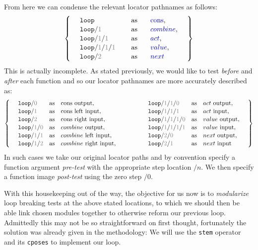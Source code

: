 \documentclass[twoside]{article}
\newcommand{\as}{\mbox{as}}
\newcommand{\vi}[1][\_]{\mbox{$value$#1input}}
\newcommand{\vo}[1][\_]{\mbox{$value$#1output}}
\newcommand{\ai}[1][\_]{\mbox{$act$#1input}}
\newcommand{\ao}[1][\_]{\mbox{$act$#1output}}
\newcommand{\cli}[1][\_]{\mbox{$combine$#1left#1input}}
\newcommand{\cri}[1][\_]{\mbox{$combine$#1right#1input}}
\newcommand{\co}[1][\_]{\mbox{$combine$#1output}}
\newcommand{\nei}[1][\_]{\mbox{$next$#1input}}
\newcommand{\no}[1][\_]{\mbox{$next$#1output}}
\newcommand{\coli}[1][\_]{\mbox{cons#1left#1input}}
\newcommand{\cori}[1][\_]{\mbox{cons#1right#1input}}
\newcommand{\coo}[1][\_]{\mbox{cons#1output}}
\newcommand{\tab}[1][1.125cm]{\hspace{#1}}
\newcommand{\col}[1][0ex]{& \hspace{#1}}
\newcommand{\tcb}[1]{\textcolor{blue}{#1}}
\newcommand{\tcg}[1]{\textcolor{gray}{#1}}
\newcommand{\tlp}{\texttt{\mbox{loop}}}
\newcommand{\cons}{\mbox{cons}}
\begin{document}
From here we can condense the relevant locator pathnames as follows:
$$ \left\{\tab[2ex]\begin{array}{lcl}
\tlp					\col[3ex] \mbox{as} \col[2ex] \tcb{\cons},		\\
\tlp/\tcg{1}				\col[3ex] \mbox{as} \col[2ex] \tcb{combine},		\\
\tlp/\tcg{1}/\tcg{1}			\col[3ex] \mbox{as} \col[2ex] \tcb{act},		\\
\tlp/\tcg{1}/\tcg{1}/\tcg{1}		\col[3ex] \mbox{as} \col[2ex] \tcb{value},		\\
\tlp/\tcg{2}				\col[3ex] \mbox{as} \col[2ex] \tcb{next}
\end{array}\tab[2ex]\right\} $$
This is actually incomplete. As stated previously, we would like to test \emph{before} and \emph{after} each function
and so our locator pathnames are more accurately described as:
$$ \def\arraystretch{1.1}\left\{\tab[2ex]\begin{array}{lcllcl}
\tlp/\tcg{0}		& \as & \coo[ ],	\col[10ex] \tlp/\tcg{1}/\tcg{1}/\tcg{0}			& \as & \ao[ ],		\\
\tlp/\tcg{1}		& \as & \coli[ ],	\col[10ex] \tlp/\tcg{1}/\tcg{1}/\tcg{1}			& \as & \ai[ ],		\\
\tlp/\tcg{2}		& \as & \cori[ ],	\col[10ex] \tlp/\tcg{1}/\tcg{1}/\tcg{1}/\tcg{0}		& \as & \vo[ ],		\\
\tlp/\tcg{1}/\tcg{0} 	& \as & \co[ ],		\col[10ex] \tlp/\tcg{1}/\tcg{1}/\tcg{1}/\tcg{1}		& \as & \vi[ ],		\\
\tlp/\tcg{1}/\tcg{1}	& \as & \cli[ ],	\col[10ex] \tlp/\tcg{2}/\tcg{0}				& \as & \no[ ],		\\
\tlp/\tcg{1}/\tcg{2}	& \as & \cri[ ],	\col[10ex] \tlp/\tcg{2}/\tcg{1}				& \as & \nei[ ]		\\
\end{array}\tab[2ex]\right\} $$
In such cases we take our original locator paths and by convention specify a function argument \emph{pre-test} with
the appropriate step location $ /n $. We then specify a function image \emph{post-test} using the zero step $ /0 $.

With this housekeeping out of the way, the objective for us now is to \emph{modularize} loop breaking tests at
the above stated locations, to which we should then be able link chosen modules together to otherwise reform our
previous loop. Admittedly this may not be so straightforward on first thought, fortunately the solution was already
given in the methodology: We will use the \texttt{stem} operator and its \texttt{cposes} to implement our loop.
\end{document}
